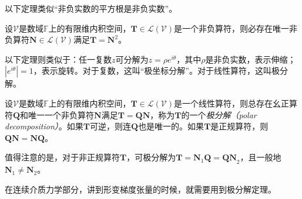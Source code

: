 \documentclass[main.tex]{subfiles}
\begin{document}
以下定理类似“非负实数的平方根是非负实数”。

\begin{theorem}\label{thm:II.2.36}
    设$\mathcal{V}$是数域$\mathbb{F}$上的有限维内积空间，$\mathbf{T}\in\mathcal{L}\left(\mathcal{V}\right)$是一个非负算符，则必存在唯一非负算符$\mathbf{N}\in\mathcal{L}\left(\mathcal{V}\right)$满足$\mathbf{T}=\mathbf{N}^2$。
\end{theorem}

以下定理则类似于：任一复数$z$可分解为$z=\rho e^{i\theta}$，其中$\rho$是非负实数，表示伸缩；$\left|e^{i\theta}\right|=1$，表示旋转。对于复数，这叫“极坐标分解”。对于线性算符，这叫极分解。

\begin{theorem}[极分解]\label{thm:II.2.37}
    设$\mathcal{V}$是数域$\mathbb{F}$上的有限维内积空间，$\mathbf{T}\in\mathcal{L}\left(\mathcal{V}\right)$是一个线性算符，则总存在幺正算符$\mathbf{Q}$和唯一一个非负算符$\mathbf{N}$满足$\mathbf{T}=\mathbf{QN}$，称为$\mathbf{T}$的一个\emph{极分解（polar decomposition）}。如果$\mathbf{T}$可逆，则连$\mathbf{Q}$也是唯一的。如果$\mathbf{T}$是正规算符，则$\mathbf{QN}=\mathbf{NQ}$。
\end{theorem}

值得注意的是，对于非正规算符$\mathbf{T}$，可极分解为$\mathbf{T}=\mathbf{N}_1\mathbf{Q}=\mathbf{QN}_2$，且一般地$\mathbf{N}_1\neq\mathbf{N}_2$。

在连续介质力学部分，讲到形变梯度张量的时候，就需要用到极分解定理。
\end{document}
